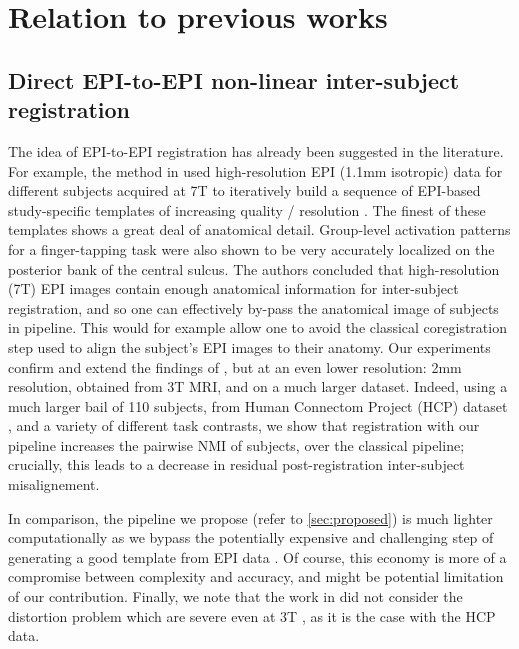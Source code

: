 \section{Relation to previous  works}
\subsection{Direct EPI-to-EPI non-linear inter-subject  registration}
The idea of EPI-to-EPI registration has already been suggested in the
literature. For example, the method in \citep{grabner2014} used
high-resolution EPI (1.1mm isotropic) data for different subjects
acquired at 7T to iteratively build a sequence of EPI-based
study-specific templates of increasing quality / resolution
\citep{pmid17354756}. The finest of these templates shows a great deal
of anatomical detail. Group-level activation patterns for a
finger-tapping task were also shown to be very accurately localized on
the posterior bank of the central sulcus. The authors concluded that
high-resolution (7T) EPI images contain enough anatomical information
for inter-subject registration, and so one can effectively by-pass the
anatomical image of subjects in pipeline. This would for example allow
one to avoid the classical coregistration step used to align the
subject's EPI images to their anatomy.  Our experiments confirm and
extend the findings of \citep{grabner2014}, but at an even lower
resolution: 2mm resolution, obtained from 3T MRI, and on a much larger
dataset. Indeed, using a much larger bail of 110 subjects, from Human
Connectom Project (HCP) dataset \citep{VanEssen20122222}, and a variety
of different task contrasts, we show that registration with our
pipeline increases the pairwise NMI of subjects, over the classical
pipeline; crucially, this leads to a decrease in residual
post-registration inter-subject misalignement.


In comparison, the pipeline we propose (refer to \ref{sec:proposed})
is much lighter computationally as
we bypass the potentially expensive and challenging step of generating a good
template from EPI data \citep{pmid17354756}. Of course, this economy is
more of a compromise between complexity and accuracy, and might be potential
limitation of our
contribution.  Finally, we note that the work in \citep{grabner2014}
did not consider the distortion problem which are severe even at 3T
\citep{anderson2003}, as it is the case with the HCP data.

